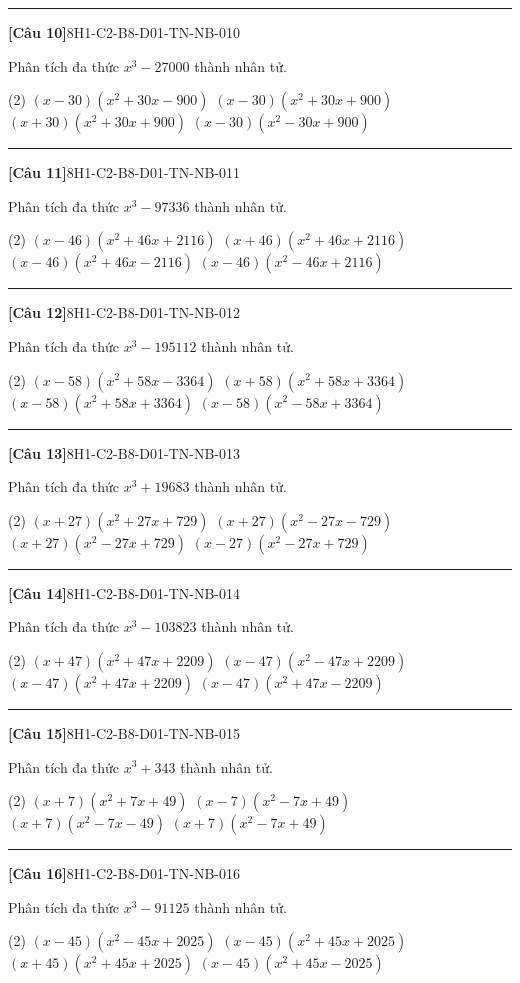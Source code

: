\documentclass[12pt,a4paper]{article}
\newif\ifloigiai
\newenvironment{cauhoi}[2]{%
  \par\medskip\noindent\rule{\textwidth}{0.4pt}\par\nopagebreak
  \noindent\textbf{[#1]}\hfill{\scriptsize\ttfamily #2}\par\nopagebreak\smallskip}{\par}
\newcommand{\dapan}[1]{\ifloigiai\par\smallskip\noindent\textit{Đáp án:} \textbf{#1}\par\fi}
\begin{document}
\begin{cauhoi}{Câu 10}{8H1-C2-B8-D01-TN-NB-010}
Phân tích đa thức $x^{3}-27000$ thành nhân tử.
\begin{tasks}(2)
\task $(x-30)(x^{2}+30x-900)$
\task $(x-30)(x^{2}+30x+900)$
\task $(x+30)(x^{2}+30x+900)$
\task $(x-30)(x^{2}-30x+900)$
\end{tasks}
\dapan{B}
\end{cauhoi}
\begin{cauhoi}{Câu 11}{8H1-C2-B8-D01-TN-NB-011}
Phân tích đa thức $x^{3}-97336$ thành nhân tử.
\begin{tasks}(2)
\task $(x-46)(x^{2}+46x+2116)$
\task $(x+46)(x^{2}+46x+2116)$
\task $(x-46)(x^{2}+46x-2116)$
\task $(x-46)(x^{2}-46x+2116)$
\end{tasks}
\dapan{A}
\end{cauhoi}
\begin{cauhoi}{Câu 12}{8H1-C2-B8-D01-TN-NB-012}
Phân tích đa thức $x^{3}-195112$ thành nhân tử.
\begin{tasks}(2)
\task $(x-58)(x^{2}+58x-3364)$
\task $(x+58)(x^{2}+58x+3364)$
\task $(x-58)(x^{2}+58x+3364)$
\task $(x-58)(x^{2}-58x+3364)$
\end{tasks}
\dapan{C}
\end{cauhoi}
\begin{cauhoi}{Câu 13}{8H1-C2-B8-D01-TN-NB-013}
Phân tích đa thức $x^{3}+19683$ thành nhân tử.
\begin{tasks}(2)
\task $(x+27)(x^{2}+27x+729)$
\task $(x+27)(x^{2}-27x-729)$
\task $(x+27)(x^{2}-27x+729)$
\task $(x-27)(x^{2}-27x+729)$
\end{tasks}
\dapan{C}
\end{cauhoi}
\begin{cauhoi}{Câu 14}{8H1-C2-B8-D01-TN-NB-014}
Phân tích đa thức $x^{3}-103823$ thành nhân tử.
\begin{tasks}(2)
\task $(x+47)(x^{2}+47x+2209)$
\task $(x-47)(x^{2}-47x+2209)$
\task $(x-47)(x^{2}+47x+2209)$
\task $(x-47)(x^{2}+47x-2209)$
\end{tasks}
\dapan{C}
\end{cauhoi}
\begin{cauhoi}{Câu 15}{8H1-C2-B8-D01-TN-NB-015}
Phân tích đa thức $x^{3}+343$ thành nhân tử.
\begin{tasks}(2)
\task $(x+7)(x^{2}+7x+49)$
\task $(x-7)(x^{2}-7x+49)$
\task $(x+7)(x^{2}-7x-49)$
\task $(x+7)(x^{2}-7x+49)$
\end{tasks}
\dapan{D}
\end{cauhoi}
\begin{cauhoi}{Câu 16}{8H1-C2-B8-D01-TN-NB-016}
Phân tích đa thức $x^{3}-91125$ thành nhân tử.
\begin{tasks}(2)
\task $(x-45)(x^{2}-45x+2025)$
\task $(x-45)(x^{2}+45x+2025)$
\task $(x+45)(x^{2}+45x+2025)$
\task $(x-45)(x^{2}+45x-2025)$
\end{tasks}
\dapan{B}
\end{cauhoi}
\end{document}
